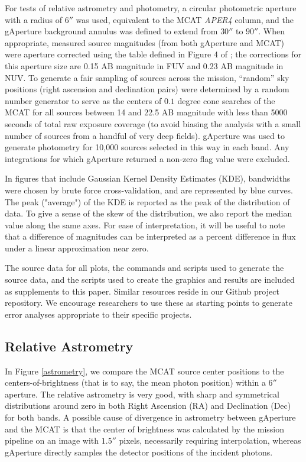 \documentclass[preprint]{aastex}
\begin{document}
For tests of relative astrometry and photometry, a circular photometric aperture with a radius of $6''$ was used, equivalent to the MCAT \emph{APER4} column, and the gAperture background annulus was defined to extend from $30''$ to $90''$. When appropriate, measured source magnitudes (from both gAperture and MCAT) were aperture corrected using the table defined in Figure 4 of \cite{mor2007}; the corrections for this aperture size are 0.15 AB magnitude in FUV and 0.23 AB magnitude in NUV. To generate a fair sampling of sources across the mission, ``random''  sky positions (right ascension and declination pairs) were determined by a random number generator to serve as the centers of $0.1$ degree cone searches of the MCAT for all sources between 14 and 22.5 AB magnitude with less than 5000 seconds of total raw exposure coverage (to avoid biasing the analysis with a small number of sources from a handful of very deep fields). gAperture was used to generate photometry for 10,000 sources selected in this way in each band. Any integrations for which gAperture returned a non-zero flag value were excluded.

In figures that include Gaussian Kernel Density Estimates (KDE), bandwidths were chosen by brute force cross-validation, and are represented by blue curves. The peak ("average") of the KDE is reported as the peak of the distribution of data. To give a sense of the skew of the distribution, we also report the median value along the same axes. For ease of interpretation, it will be useful to note that a difference of magnitudes can be interpreted as a percent difference in flux under a linear approximation near zero.

The source data for all plots, the commands and scripts used to generate the source data, and the scripts used to create the graphics and results are included as supplements to this paper. Similar resources reside in our Github project repository. We encourage researchers to use these as starting points to generate error analyses appropriate to their specific projects.

\subsection{Relative Astrometry}
In Figure \ref{astrometry}, we compare the MCAT source center positions to the centers-of-brightness (that is to say, the mean photon position) within a $6''$ aperture. The relative astrometry is very good, with sharp and symmetrical distributions around zero in both Right Ascension (RA) and Declination (Dec) for both bands. A possible cause of divergence in astrometry between gAperture and the MCAT is that the center of brightness was calculated by the mission pipeline on an image with $1.5''$ pixels, necessarily requiring interpolation, whereas gAperture directly samples the detector positions of the incident photons.
\end{document}
